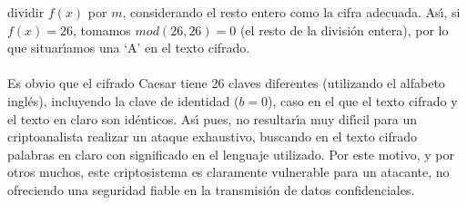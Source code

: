 dividir $f(x)$ por $m$, considerando el resto entero como la cifra adecuada.
As\'{\i}, si $f(x)=26$, tomamos $mod(26,26)=0$ (el resto de la divisi\'on
entera), por lo que situar\'{\i}amos una `A' en el texto cifrado.\\
\\Es obvio que el cifrado Caesar tiene 26 claves diferentes (utilizando
el alfabeto ingl\'es), incluyendo la clave de identidad ($b=0$), caso
en el que el texto cifrado y el texto en claro son id\'enticos. As\'{\i}
pues, no resultar\'{\i}a muy dif\'{\i}cil para un criptoanalista realizar
un ataque exhaustivo, buscando en el texto cifrado palabras en claro con
significado en el lenguaje utilizado. Por este motivo, y por otros muchos, este 
criptosistema es claramente vulnerable para un atacante, no ofreciendo una 
seguridad fiable en la transmisi\'on de datos confidenciales.
